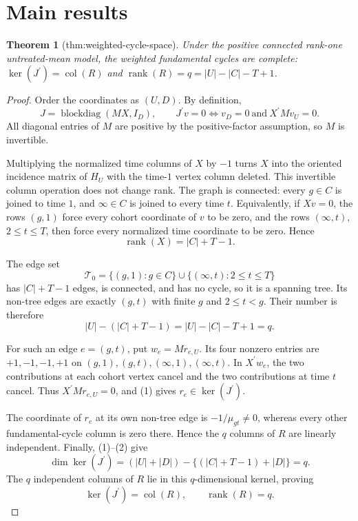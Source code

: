 \documentclass{article}
\newtheorem{theorem}{Theorem}
\begin{document}
\section{Main results}

\begin{theorem}[thm:weighted-cycle-space]\label{thm:weighted-cycle-space}
Under the positive connected rank-one untreated-mean model, the weighted fundamental cycles are complete: \(\ker(J^{\prime})=\operatorname{col}(R)\) and \(\operatorname{rank}(R)=q=|U|-|C|-T+1\).
\end{theorem}
\begin{proof}
Order the coordinates as \((U,D)\). By definition,
\[
J=\operatorname{blockdiag}(MX,I_D),
\qquad
J^{\prime}v=0
\Longleftrightarrow
v_D=0\ \text{and}\ X^{\prime}Mv_U=0.                  \tag{1}
\]
All diagonal entries of \(M\) are positive by the positive-factor assumption, so \(M\) is invertible.

Multiplying the normalized time columns of \(X\) by \(-1\) turns \(X\) into the oriented incidence matrix of \(H_U\) with the time-\(1\) vertex column deleted. This invertible column operation does not change rank. The graph is connected: every \(g\in C\) is joined to time \(1\), and \(\infty\in C\) is joined to every time \(t\). Equivalently, if \(Xv=0\), the rows \((g,1)\) force every cohort coordinate of \(v\) to be zero, and the rows \((\infty,t)\), \(2\le t\le T\), then force every normalized time coordinate to be zero. Hence
\[
\operatorname{rank}(X)=|C|+T-1.                       \tag{2}
\]

The edge set
\[
\mathcal T_0=\{(g,1):g\in C\}\cup
\{(\infty,t):2\le t\le T\}
\]
has \(|C|+T-1\) edges, is connected, and has no cycle, so it is a spanning tree. Its non-tree edges are exactly \((g,t)\) with finite \(g\) and \(2\le t<g\). Their number is therefore
\[
|U|-(|C|+T-1)=|U|-|C|-T+1=q.                           \tag{3}
\]

For such an edge \(e=(g,t)\), put \(w_e=Mr_{e,U}\). Its four nonzero entries are \(+1,-1,-1,+1\) on \((g,1),(g,t),(\infty,1),(\infty,t)\). In \(X^{\prime}w_e\), the two contributions at each cohort vertex cancel and the two contributions at time \(t\) cancel. Thus \(X^{\prime}Mr_{e,U}=0\), and (1) gives \(r_e\in\ker(J^{\prime})\).

The coordinate of \(r_e\) at its own non-tree edge is \(-1/\mu_{gt}\ne0\), whereas every other fundamental-cycle column is zero there. Hence the \(q\) columns of \(R\) are linearly independent. Finally, (1)--(2) give
\[
\dim\ker(J^{\prime})
=(|U|+|D|)-\{(|C|+T-1)+|D|\}=q.                        \tag{4}
\]
The \(q\) independent columns of \(R\) lie in this \(q\)-dimensional kernel, proving
\[
\ker(J^{\prime})=\operatorname{col}(R),
\qquad
\operatorname{rank}(R)=q.
\]
\end{proof}
\end{document}
